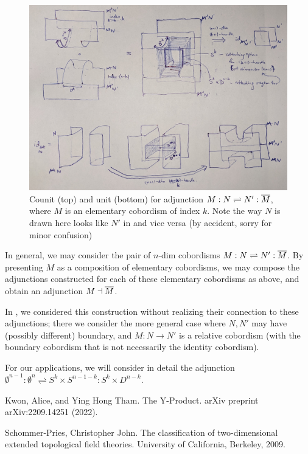 \documentclass[12pt]{article}
\newcommand{\disk}[1]{{D^{#1}}}
\newcommand{\sphr}[1]{{S^{#1}}}
\newcommand{\empt}[1]{{\emptyset^{#1}}}
\begin{document}
\begin{figure}[ht]
\includegraphics[width=15cm]{diagram-counit-unit-elementary-cobord.jpg}
\caption{Counit (top) and unit (bottom) for adjunction
$M: N \rightleftharpoons N': \overline{M}$,
where $M$ is an elementary cobordism of index $k$.
Note the way $N$ is drawn here looks like $N'$
in  and vice versa
(by accident, sorry for minor confusion)}
\label{f:elementary-cobord-counit-unit}
\end{figure}



In general, we may consider the pair of $n$-dim cobordisms
$M : N \rightleftharpoons N': \overline{M}$.
By presenting $M$ as a composition of elementary cobordisms,
we may compose the adjunctions constructed
for each of these elementary cobordisms as above,
and obtain an adjunction $M \dashv \overline{M}$.



\begin{remark}
In \cite{Yprod},
we considered this construction
without realizing their connection to these adjunctions;
there we consider the more general case where
$N,N'$ may have (possibly different) boundary, and
$M: N \to N'$ is a relative cobordism
(with the boundary cobordism that is
not necessarily the identity cobordism).
\end{remark}


For our applications,
we will consider in detail the adjunction
$\empt{n-1} : \empt{n} \rightleftharpoons
	\sphr{k} \times \sphr{n-1-k} : \sphr{k} \times \disk{n-k}$.


\begin{thebibliography}{1}

 Kwon, Alice, and Ying Hong Tham. The Y-Product. arXiv preprint arXiv:2209.14251 (2022).

 Schommer-Pries, Christopher John. The classification of two-dimensional extended topological field theories. University of California, Berkeley, 2009.

\end{thebibliography}
\end{document}

